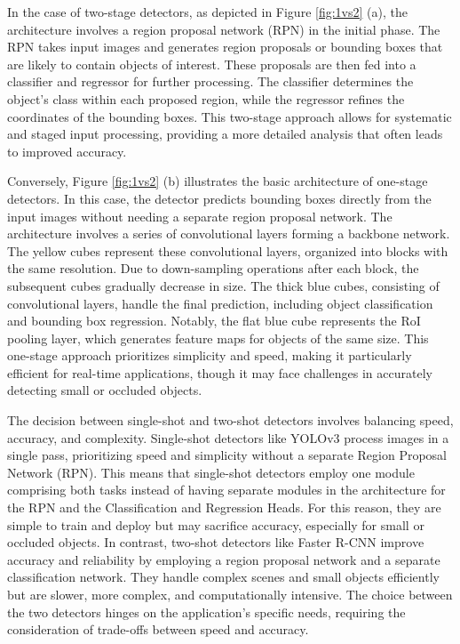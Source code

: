 In the case of two-stage detectors, as depicted in Figure \ref{fig:1vs2} (a), the architecture involves a region proposal network (RPN) in the initial phase. The RPN takes input images and generates region proposals or bounding boxes that are likely to contain objects of interest. These proposals are then fed into a classifier and regressor for further processing. The classifier determines the object's class within each proposed region, while the regressor refines the coordinates of the bounding boxes. This two-stage approach allows for systematic and staged input processing, providing a more detailed analysis that often leads to improved accuracy.

Conversely, Figure \ref{fig:1vs2} (b) illustrates the basic architecture of one-stage detectors. In this case, the detector predicts bounding boxes directly from the input images without needing a separate region proposal network. The architecture involves a series of convolutional layers forming a backbone network. The yellow cubes represent these convolutional layers, organized into blocks with the same resolution. Due to down-sampling operations after each block, the subsequent cubes gradually decrease in size. The thick blue cubes, consisting of convolutional layers, handle the final prediction, including object classification and bounding box regression. Notably, the flat blue cube represents the RoI pooling layer, which generates feature maps for objects of the same size. This one-stage approach prioritizes simplicity and speed, making it particularly efficient for real-time applications, though it may face challenges in accurately detecting small or occluded objects.


The decision between single-shot and two-shot detectors involves balancing speed, accuracy, and complexity. Single-shot detectors like YOLOv3 \cite{YOLOv3} process images in a single pass, prioritizing speed and simplicity without a separate Region Proposal Network (RPN). This means that single-shot detectors employ one module comprising both tasks instead of having separate modules in the architecture for the RPN and the Classification and Regression Heads. For this reason, they are simple to train and deploy but may sacrifice accuracy, especially for small or occluded objects. In contrast, two-shot detectors like Faster R-CNN improve accuracy and reliability by employing a region proposal network and a separate classification network. They handle complex scenes and small objects efficiently but are slower, more complex, and computationally intensive. The choice between the two detectors hinges on the application's specific needs, requiring the consideration of trade-offs between speed and accuracy.


